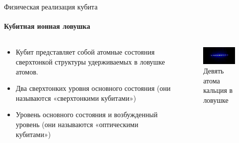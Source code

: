 \documentclass{beamer}
\begin{document}


    \begin{frame}{Физическая реализация кубита}
    \framesubtitle{Кубитная ионная ловушка}

        \begin{columns}

        \begin{column}{0.6\textwidth}

            \begin{itemize}
                \item <1-> Кубит представляет собой атомные состояния сверхтонкой структуры удерживаемых в ловушке атомов. 
                \item <2-> Два сверхтонких уровня основного состояния (они называются «сверхтонкими кубитами»)
                \item <3-> Уровень основного состояния и возбужденный уровень (они называются «оптическими кубитами»)
            \end{itemize}

        \end{column}

        \begin{column}{0.4\textwidth}
            \begin{figure}
                \centering
                \includegraphics[width=\textwidth]{media/nine-calcium-ions.jpg}
                \caption{Девять атома кальция в ловушке}
            \end{figure}
        \end{column}

        \end{columns}

    \end{frame}
\end{document}
